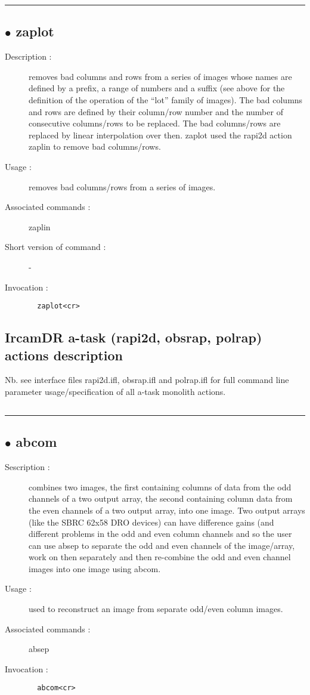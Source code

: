 \hrule \subsection*{$\bullet$ zaplot}
\begin{description}
\item[Description :] removes bad columns and rows from a series of images whose names
are defined by a prefix, a range of numbers and a suffix (see above for
the definition of the operation of the ``lot'' family of images).  The bad
columns and rows are defined by their column/row number and the number of
consecutive columns/rows to be replaced.  The bad columns/rows are
replaced by linear interpolation over then.  zaplot used the rapi2d
action zaplin to remove bad columns/rows.
\item[Usage :] removes bad columns/rows from a series of images.
\item[Associated commands :] zaplin
\item[Short version of command :] -
\item[Invocation :]

\verb+  zaplot<cr> +\end{description}

\subsection{IrcamDR a-task (rapi2d, obsrap, polrap) actions description}

Nb. see interface files rapi2d.ifl, obsrap.ifl and polrap.ifl for full
command line parameter usage/specification of all a-task monolith
actions.
\subsection*{}

\hrule \subsection*{$\bullet$ abcom}
\begin{description}

\item[Sescription :] combines two images, the first containing columns of data from
the odd channels of a two output array, the second containing column data
from the even channels of a two output array, into one image. Two output
arrays (like the SBRC 62x58 DRO devices) can have difference gains (and
different problems in the odd and even column channels and so the user
can use absep to separate the odd and even channels of the image/array,
work on then separately and then re-combine the odd and even channel
images into one image using abcom.
\item[Usage :] used to reconstruct an image from separate odd/even column images.
\item[Associated commands :] absep
\item[Invocation :]

\verb+  abcom<cr> +\end{description}

